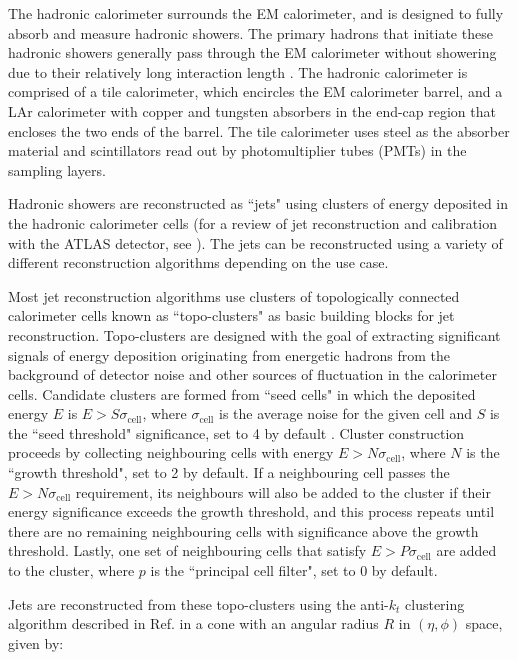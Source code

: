 The hadronic calorimeter surrounds the EM calorimeter, and is designed to fully absorb and measure hadronic showers. The primary hadrons that initiate these hadronic showers generally pass through the EM calorimeter without showering due to their relatively long interaction length \cite{atlas}. The hadronic calorimeter is comprised of a tile calorimeter, which encircles the EM calorimeter barrel, and a LAr calorimeter with copper and tungsten absorbers in the end-cap region that encloses the two ends of the barrel. The tile calorimeter uses steel as the absorber material and scintillators read out by photomultiplier tubes (PMTs) in the sampling layers. 

Hadronic showers are reconstructed as ``jets" using clusters of energy deposited in the hadronic calorimeter cells (for a review of jet reconstruction and calibration with the ATLAS detector, see \cite{jet_reco}). The jets can be reconstructed using a variety of different reconstruction algorithms depending on the use case. 

Most jet reconstruction algorithms use clusters of topologically connected calorimeter cells known as ``topo-clusters" as basic building blocks for jet reconstruction. Topo-clusters are designed with the goal of extracting significant signals of energy deposition originating from energetic hadrons from the background of detector noise and other sources of fluctuation in the calorimeter cells. Candidate clusters are formed from ``seed cells" in which the deposited energy \(E\) is \(E>S\sigma_\text{cell}\), where \(\sigma_\text{cell}\) is the average noise for the given cell and \(S\) is the ``seed threshold" significance, set to 4 by default \cite{topo_cell_clustering}. Cluster construction proceeds by collecting neighbouring cells with energy \(E>N\sigma_\text{cell}\), where \(N\) is the ``growth threshold", set to 2 by default. If a neighbouring cell passes the \(E>N\sigma_\text{cell}\) requirement, its neighbours will also be added to the cluster if their energy significance exceeds the growth threshold, and this process repeats until there are no remaining neighbouring cells with significance above the growth threshold. Lastly, one set of neighbouring cells that satisfy \(E>P\sigma_\text{cell}\) are added to the cluster, where \(p\) is the ``principal cell filter", set to 0 by default.

Jets are reconstructed from these topo-clusters using the anti-\(k_t\) clustering algorithm described in Ref. \cite{akt_algo} in a cone with an angular radius \(R\) in \((\eta, \phi)\) space, given by:


